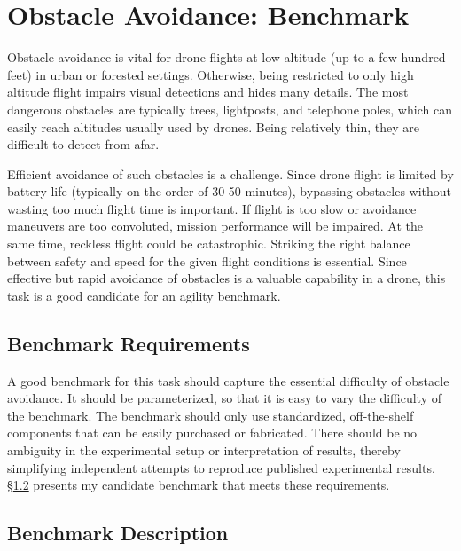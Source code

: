 \section{Obstacle Avoidance: Benchmark}
\label{sec:avoidance}
Obstacle avoidance is vital for drone flights at low altitude (up to a
few hundred feet) in urban or forested settings. Otherwise, being restricted to only high altitude flight impairs visual detections and hides many details.  The most dangerous obstacles are
typically trees, lightposts, and telephone poles, which can easily
reach altitudes usually used by drones. Being  relatively thin,
they are difficult to detect from afar.  

Efficient avoidance of such obstacles is a challenge.  Since drone
flight is limited by battery life (typically on the order of 30-50
minutes), bypassing obstacles without wasting too much flight time is
important. If flight is too slow or avoidance maneuvers are too
convoluted, mission performance will be impaired.  At the same time,
reckless flight could be catastrophic.  Striking the right balance
between safety and speed for the given flight conditions is essential.
Since effective but rapid avoidance of obstacles is a valuable
capability in a drone, this task is a good candidate for an agility
benchmark.

\subsection{Benchmark Requirements}
\label{sec:avoidance-requirements}

A good benchmark for this task should capture the essential difficulty
of obstacle avoidance.  It should be parameterized, so that it is easy to
vary the difficulty of the benchmark.  The benchmark should only use
standardized, off-the-shelf components that can be easily purchased or
fabricated.  There should be no ambiguity in the experimental setup or
interpretation of results, thereby simplifying independent attempts to
reproduce published experimental results.
\S\ref{sec:avoidance-description} presents my candidate benchmark
that meets these requirements.

\subsection{Benchmark Description}
\label{sec:avoidance-description}

